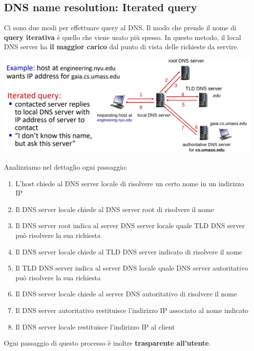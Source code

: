 \documentclass[12pt]{article}
\begin{document}
\subsection{DNS name resolution: Iterated query}
Ci sono due modi per effettuare query al DNS.
Il modo che prende il nome di \textbf{query iterativa} è quello che viene usato più spesso.
In questo metodo, il local DNS server ha \textbf{il maggior carico} dal punto di vista delle richieste da servire.
\begin{center}
    \includegraphics[width = 1\linewidth]{Images/34.png}
\end{center}
\newpage \noindent
Analizziamo nel dettaglio ogni passaggio:
\begin{enumerate}
    \item L'host chiede al DNS server locale di risolvere un certo nome in un indirizzo IP
    \item Il DNS server locale chiede al DNS server root di risolvere il nome
    \item Il DNS server root indica al server DNS server locale quale TLD DNS server può risolvere la sua richiesta
    \item Il DNS server locale chiede al TLD DNS server indicato di risolvere il nome
    \item Il TLD DNS server indica al server DNS locale quale DNS server autoritativo può risolvere la sua richiesta
    \item Il DNS server locale chiede al server DNS autoritativo di risolvere il nome
    \item Il DNS server autoritativo restituisce l'indirizzo IP associato al nome indicato
    \item Il DNS server locale restituisce l'indirizzo IP al client
\end{enumerate}
Ogni passaggio di questo processo è inoltre \textbf{trasparente all'utente}.
\end{document}
